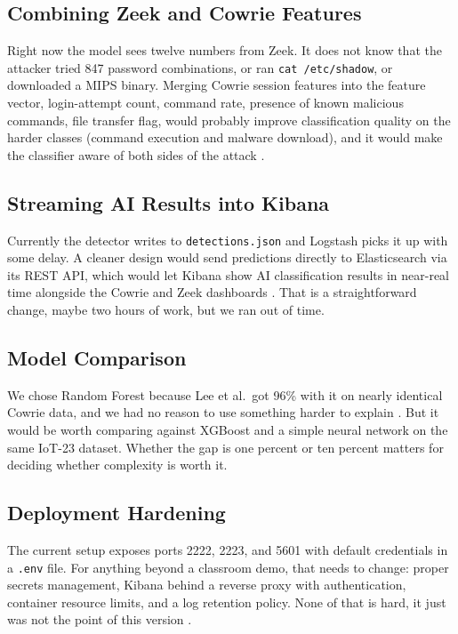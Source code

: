 \subsection{Combining Zeek and Cowrie Features}
\label{subsec:combined_features}

Right now the model sees twelve numbers from Zeek. It does not know that the attacker tried 847 password combinations, or ran \texttt{cat /etc/shadow}, or downloaded a MIPS binary. Merging Cowrie session features into the feature vector, login-attempt count, command rate, presence of known malicious commands, file transfer flag, would probably improve classification quality on the harder classes (command execution and malware download), and it would make the classifier aware of both sides of the attack \cite{9071014,dimauro2021supervised}.

\subsection{Streaming AI Results into Kibana}
\label{subsec:indexing_ai_results}

Currently the detector writes to \texttt{detections.json} and Logstash picks it up with some delay. A cleaner design would send predictions directly to Elasticsearch via its REST API, which would let Kibana show AI classification results in near-real time alongside the Cowrie and Zeek dashboards \cite{9001068,log2evt2025}. That is a straightforward change, maybe two hours of work, but we ran out of time.

\subsection{Model Comparison}
\label{subsec:additional_ml_models}

We chose Random Forest because Lee et al.\ got 96\% with it on nearly identical Cowrie data, and we had no reason to use something harder to explain \cite{lee2021classification,saied2023comparative}. But it would be worth comparing against XGBoost and a simple neural network on the same IoT-23 dataset. Whether the gap is one percent or ten percent matters for deciding whether complexity is worth it.

\subsection{Deployment Hardening}
\label{subsec:deployment_security}

The current setup exposes ports 2222, 2223, and 5601 with default credentials in a \texttt{.env} file. For anything beyond a classroom demo, that needs to change: proper secrets management, Kibana behind a reverse proxy with authentication, container resource limits, and a log retention policy. None of that is hard, it just was not the point of this version \cite{commey2025blockchain,franco2021survey}.

